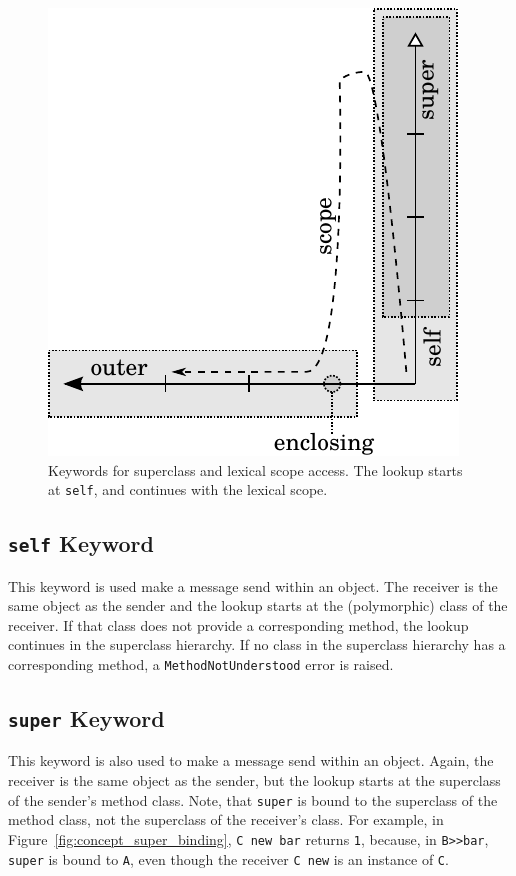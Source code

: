 \begin{figure}[!htp]
	\centering
	\includegraphics[scale=1]{lookup_keywords.pdf}
	\caption[Keywords for superclass and lexical scope access]{Keywords for superclass and lexical scope access. The lookup starts at \texttt{self}, and continues with the lexical scope.}
	\label{fig:concept_keywords}
\end{figure}

\subsection{\texttt{self} Keyword}
This keyword is used make a message send within an object. The receiver is the same object as the sender and the lookup starts at the (polymorphic) class of the receiver. If that class does not provide a corresponding method, the lookup continues in the superclass hierarchy. If no class in the superclass hierarchy has a corresponding method, a \texttt{MethodNotUnderstood} error is raised.

\subsection{\texttt{super} Keyword}
This keyword is also used to make a message send within an object. Again, the receiver is the same object as the sender, but the lookup starts at the superclass of the sender's method class. Note, that \texttt{super} is bound to the superclass of the method class, not the superclass of the receiver's class. For example, in Figure~\ref{fig:concept_super_binding}, \texttt{C new bar} returns \texttt{1}, because, in \texttt{B>>bar}, \texttt{super} is bound to \texttt{A}, even though the receiver \texttt{C new} is an instance of \texttt{C}.


